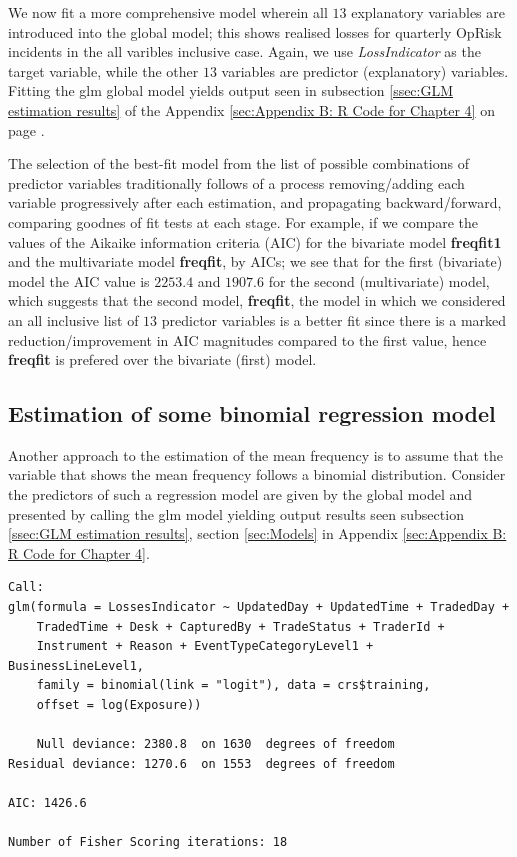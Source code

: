 \documentclass{DissertateUSU}
\begin{document}
We now fit a more comprehensive model wherein all \(13\) explanatory
variables are introduced into the global model; this shows realised
losses for quarterly OpRisk incidents in the all varibles inclusive
case. Again, we use \emph{LossIndicator} as the target variable, while
the other \(13\) variables are predictor (explanatory) variables.
Fitting the glm global model yields output seen in subsection
\ref{ssec:GLM estimation results} of the Appendix
\ref{sec:Appendix B: R Code for Chapter 4} on page \pageref{sec:Models}.

The selection of the best-fit model from the list of possible
combinations of predictor variables traditionally follows of a process
removing/adding each variable progressively after each estimation, and
propagating backward/forward, comparing goodnes of fit tests at each
stage. For example, if we compare the values of the Aikaike information
criteria (AIC) for the bivariate model \textbf{freqfit1} and the
multivariate model \textbf{freqfit}, by AICs; we see that for the first
(bivariate) model the AIC value is \(2253.4\) and \(1907.6\) for the
second (multivariate) model, which suggests that the second model,
\textbf{freqfit}, the model in which we considered an all inclusive list
of \(13\) predictor variables is a better fit since there is a marked
reduction/improvement in AIC magnitudes compared to the first value,
hence \textbf{freqfit} is prefered over the bivariate (first) model.

\singlespacing

\doublespacing

\subsection{Estimation of some binomial regression model}

Another approach to the estimation of the mean frequency is to assume
that the variable that shows the mean frequency follows a binomial
distribution. Consider the predictors of such a regression model are
given by the global model and presented by calling the glm model
yielding output results seen subsection
\ref{ssec:GLM estimation results}, section \ref{sec:Models} in Appendix
\ref{sec:Appendix B: R Code for Chapter 4}.

\singlespacing

\doublespacing

\singlespacing
\begin{verbatim}
Call:
glm(formula = LossesIndicator ~ UpdatedDay + UpdatedTime + TradedDay + 
    TradedTime + Desk + CapturedBy + TradeStatus + TraderId + 
    Instrument + Reason + EventTypeCategoryLevel1 + BusinessLineLevel1, 
    family = binomial(link = "logit"), data = crs$training,
    offset = log(Exposure))

    Null deviance: 2380.8  on 1630  degrees of freedom
Residual deviance: 1270.6  on 1553  degrees of freedom

AIC: 1426.6

Number of Fisher Scoring iterations: 18
\end{verbatim}
\doublespacing
\end{document}
